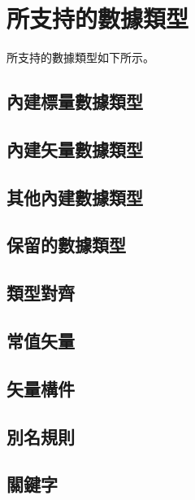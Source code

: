 \section{所支持的數據類型}

所支持的數據類型如下所示。

\subsection{內建標量數據類型}

\subsection{內建矢量數據類型}

\subsection{其他內建數據類型}

\subsection{保留的數據類型}

\subsection{類型對齊}

\subsection{常值矢量}

\subsection{矢量構件}

\subsection{別名規則}

\subsection{關鍵字}


